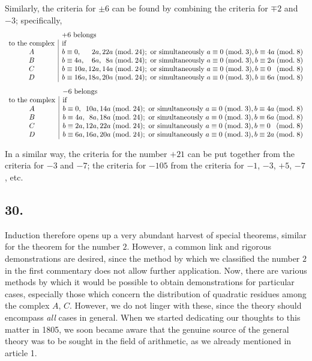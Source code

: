 \documentclass[twoside,12pt]{memoir}
\renewcommand{\pmod}[1]{\;(\textrm{mod.}\;#1)}
\begin{document}
Similarly, the criteria for \(\pm 6\) can be found by combining the criteria for \(\mp 2\) and \(-3\); specifically,
\[\begin{array}{c|l}
\multicolumn{1}{c}{}&\multicolumn{1}{l}{+6\text{ belongs}}\\
\text{to the complex}&\text{if}\\
A & b \equiv 0, \phantom{00a}2a, 22a \pmod{24}; \text{ or simultaneously } a \equiv 0 \pmod{3}, b \equiv 4a \pmod{8} \\
B & b \equiv 4a, \phantom{00}6a, \phantom{0}8a \pmod{24}; \text{ or simultaneously } a \equiv 0 \pmod{3}, b \equiv 2a \pmod{8} \\
C & b \equiv 10a, 12a, 14a \pmod{24}; \text{ or simultaneously } a \equiv 0 \pmod{3}, b \equiv 0\phantom{a} \pmod{8} \\
D & b \equiv 16a, 18a, 20a \pmod{24}; \text{ or simultaneously } a \equiv 0 \pmod{3}, b \equiv 6a \pmod{8}
\end{array}\]
\[\begin{array}{c|l}
\multicolumn{1}{c}{}&\multicolumn{1}{l}{-6\text{ belongs}}\\
\text{to the complex}&\text{if}\\
A & b \equiv 0,\phantom{a} 10a, 14a \pmod{24}; \text{ or simultaneously } a \equiv 0 \pmod{3}, b \equiv 4a \pmod{8} \\
B & b \equiv 4a, \phantom{0}8a, 18a \pmod{24}; \text{ or simultaneously } a \equiv 0 \pmod{3}, b \equiv 6a \pmod{8} \\
C & b \equiv 2a, 12a, 22a \pmod{24}; \text{ or simultaneously } a \equiv 0 \pmod{3}, b \equiv 0\phantom{a} \pmod{8} \\
D & b \equiv 6a, 16a, 20a \pmod{24}; \text{ or simultaneously } a \equiv 0 \pmod{3}, b \equiv 2a \pmod{8}
\end{array}\]

In a similar way, the criteria for the number \(+21\) can be put together from the criteria for \(-3\) and \(-7\); the criteria for \(-105\) from the criteria for \(-1\), \(-3\), \(+5\), \(-7\), etc{.}

\subsection*{30.}

Induction therefore opens up a very abundant harvest of special theorems, similar for the theorem for the number \(2\).  However, a common link and rigorous demonstrations are desired, since the method by which we classified the number \(2\) in the first commentary does not allow further application. Now, there are various methods by which it would be possible to obtain demonstrations for particular cases, especially those which concern the distribution of quadratic residues among the complex \(A\), \(C\). However, we do not linger with these, since the theory should encompass \textit{all} \pagebreak%
cases in general. When we started dedicating our thoughts to this matter in 1805, we soon became aware that the genuine source of the general theory was to be sought in the field of arithmetic, as we already mentioned in article 1.
\end{document}
